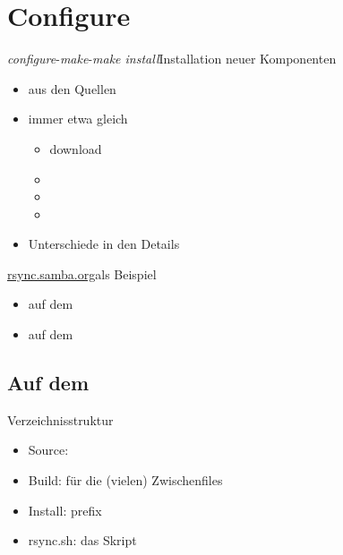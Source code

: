\section{Configure}
\begin{frame}{{\em configure}-{\em make}-{\em make install}}{Installation neuer Komponenten}
 \begin{itemize}
  \item aus den Quellen
  \item immer etwa gleich
  \begin{itemize}
   \item download
   \item {}
   \item {}
   \item {}
  \end{itemize}
  \item Unterschiede in den Details
 \end{itemize}
\end{frame}

\begin{frame}{\url{rsync.samba.org}}{als Beispiel}
 \begin{itemize}
  \item auf dem \host
  \item auf dem \targetS
 \end{itemize}
\end{frame}


\subsection{Auf dem \host}

\begin{frame}{Verzeichnisstruktur}
 \begin{itemize}
  \item Source:
  \item Build:   für die (vielen) Zwischenfiles
  \item Install: prefix
  \item rsync.sh: das Skript
 \end{itemize}
\end{frame}

